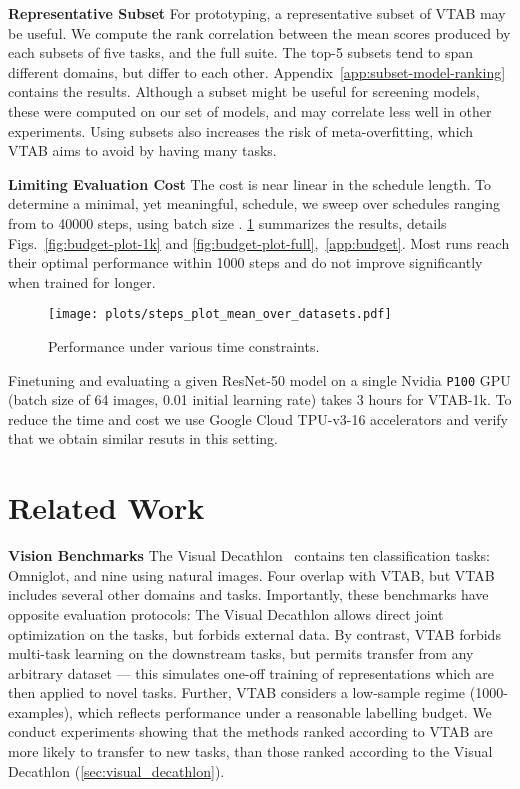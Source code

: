 \documentclass{article}
\newcommand{\myparagraph}[1]{\noindent\textbf{#1}\quad}
\begin{document}
\myparagraph{Representative Subset}
For prototyping, a representative subset of VTAB may be useful.
We compute the rank correlation between the mean scores produced by each   subsets of five tasks, and the full suite.
The top-5 subsets tend to span different domains, but differ to each other.
Appendix~\ref{app:subset-model-ranking} contains the results.
Although a subset might be useful for screening models, these were computed on our set of models, and may correlate less well in other experiments.
Using subsets also increases the risk of meta-overfitting, which VTAB aims to avoid by having many tasks.

\myparagraph{Limiting Evaluation Cost}
The cost is near linear in the schedule length.
To determine a minimal, yet meaningful, schedule, we sweep over schedules ranging from  to \num{40000} steps, using batch size .
\cref{fig:budget-plot-mean} summarizes the results, details Figs.~\ref{fig:budget-plot-1k} and \ref{fig:budget-plot-full},~\cref{app:budget}.
Most runs reach their optimal performance within \num{1000} steps and do not improve significantly when trained for longer.

\begin{figure}
  \centering
  \texttt{[image: plots/steps\_plot\_mean\_over\_datasets.pdf]}
  \vspace{-10pt}
  \caption{Performance under various time constraints.}
  \label{fig:budget-plot-mean}
  \vspace{-15pt}
\end{figure}

Finetuning and evaluating a given ResNet-50 model on a single Nvidia \texttt{P100} GPU (batch size of 64 images, 0.01 initial learning rate) takes 3 hours for VTAB-1k.
To reduce the time and cost we use Google Cloud TPU-v3-16 accelerators and verify that we obtain similar resuts in this setting.



\section{Related Work \label{sec:related_work}}

\myparagraph{Vision Benchmarks}
The Visual Decathlon~\citep{rebuffi2017} contains ten classification tasks: 
Omniglot, and nine using natural images. 
Four overlap with VTAB, but VTAB includes several other domains and tasks.
Importantly, these benchmarks have opposite evaluation protocols:
The Visual Decathlon allows direct joint optimization on the tasks, but forbids external data. 
By contrast, VTAB forbids multi-task learning on the downstream tasks, but permits transfer from any arbitrary dataset --- this simulates one-off training of representations which are then applied to novel tasks.
Further, VTAB considers a low-sample regime (1000-examples), which reflects performance under a reasonable labelling budget.
We conduct experiments showing that the methods ranked according to  VTAB are more likely to transfer to new tasks, than those ranked according to the Visual Decathlon (\cref{sec:visual_decathlon}).
\end{document}
